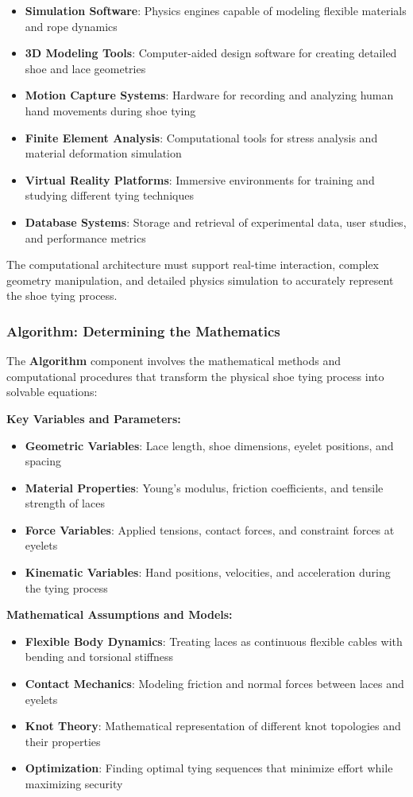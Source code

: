 \begin{itemize}
    \item \textbf{Simulation Software}: Physics engines capable of modeling flexible materials and rope dynamics
    \item \textbf{3D Modeling Tools}: Computer-aided design software for creating detailed shoe and lace geometries
    \item \textbf{Motion Capture Systems}: Hardware for recording and analyzing human hand movements during shoe tying
    \item \textbf{Finite Element Analysis}: Computational tools for stress analysis and material deformation simulation
    \item \textbf{Virtual Reality Platforms}: Immersive environments for training and studying different tying techniques
    \item \textbf{Database Systems}: Storage and retrieval of experimental data, user studies, and performance metrics
\end{itemize}

The computational architecture must support real-time interaction, complex geometry manipulation, and detailed physics simulation to accurately represent the shoe tying process.

\subsubsection{Algorithm: Determining the Mathematics}

The \textbf{Algorithm} component involves the mathematical methods and computational procedures that transform the physical shoe tying process into solvable equations:

\textbf{Key Variables and Parameters:}
\begin{itemize}
    \item \textbf{Geometric Variables}: Lace length, shoe dimensions, eyelet positions, and spacing
    \item \textbf{Material Properties}: Young's modulus, friction coefficients, and tensile strength of laces
    \item \textbf{Force Variables}: Applied tensions, contact forces, and constraint forces at eyelets
    \item \textbf{Kinematic Variables}: Hand positions, velocities, and acceleration during the tying process
\end{itemize}

\textbf{Mathematical Assumptions and Models:}
\begin{itemize}
    \item \textbf{Flexible Body Dynamics}: Treating laces as continuous flexible cables with bending and torsional stiffness
    \item \textbf{Contact Mechanics}: Modeling friction and normal forces between laces and eyelets
    \item \textbf{Knot Theory}: Mathematical representation of different knot topologies and their properties
    \item \textbf{Optimization}: Finding optimal tying sequences that minimize effort while maximizing security
\end{itemize}

